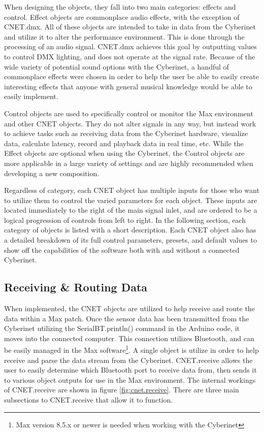 When designing the objects, they fall into two main categories: effects and control. Effect objects are commonplace audio effects, with the exception of CNET.dmx. All of these objects are intended to take in data from the Cyberinet and utilize it to alter the performance environment. This is done through the processing of an audio signal. CNET.dmx achieves this goal by outputting values to control DMX lighting, and does not operate at the signal rate. Because of the wide variety of potential sound options with the Cyberinet, a handful of commonplace effects were chosen in order to help the user be able to easily create interesting effects that anyone with general musical knowledge would be able to easily implement.

Control objects are used to specifically control or monitor the Max environment and other CNET objects. They do not alter signals in any way, but instead work to achieve tasks such as receiving data from the Cyberinet hardware, visualize data, calculate latency, record and playback data in real time, etc. While the Effect objects are optional when using the Cyberinet, the Control objects are more applicable in a large variety of settings and are highly recommended when developing a new composition.

Regardless of category, each CNET object has multiple inputs for those who want to utilize them to control the varied parameters for each object. These inputs are located immediately to the right of the main signal inlet, and are ordered to be a logical progression of controls from left to right. In the following section, each category of objects is listed with a short description. Each CNET object also has a detailed breakdown of its full control parameters, presets, and default values to show off the capabilities of the software both with and without a connected Cyberinet.


\subsection{Receiving \& Routing Data}


When implemented, the CNET objects are utilized to help receive and route the data within a Max patch. Once the sensor data has been transmitted from the Cyberinet utilizing the SerialBT.println() command in the Arduino code, it moves into the connected computer. This connection utilizes Bluetooth, and can be easily managed in the Max software\footnote{Max version 8.5.x or newer is needed when working with the Cyberinet}. A single object is utilize in order to help receive and parse the data stream from the Cyberinet. CNET.receive allows the user to easily determine which Bluetooth port to receive data from, then sends it to various object outputs for use in the Max environment. The internal workings of CNET.receive are shown in figure \ref{fig:cnet.receive}. There are three main subsections to CNET.receive that allow it to function.


